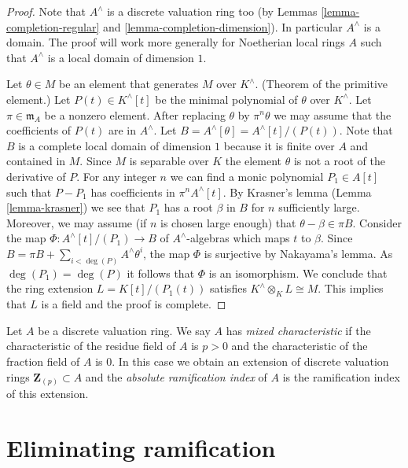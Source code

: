 \begin{proof}
Note that $A^\wedge$ is a discrete valuation ring too (by
Lemmas \ref{lemma-completion-regular} and \ref{lemma-completion-dimension}).
In particular $A^\wedge$ is a domain. The proof will work more generally
for Noetherian local rings $A$ such that $A^\wedge$ is a local domain
of dimension $1$.

\medskip\noindent
Let $\theta \in M$ be an element that generates $M$ over $K^\wedge$.
(Theorem of the primitive element.)
Let $P(t) \in K^\wedge[t]$ be the minimal polynomial of $\theta$ over
$K^\wedge$. Let $\pi \in \mathfrak m_A$ be a nonzero element.
After replacing $\theta$ by $\pi^n\theta$ we may assume that
the coefficients of $P(t)$ are in $A^\wedge$. Let
$B = A^\wedge[\theta] = A^\wedge[t]/(P(t))$. Note that $B$ is
a complete local domain of dimension $1$ because it is finite over $A$ and
contained in $M$. Since $M$ is separable over $K$ the element $\theta$
is not a root of the derivative of $P$. For any integer $n$ we can find
a monic polynomial $P_1 \in A[t]$ such that $P - P_1$ has coefficients in
$\pi^nA^\wedge[t]$. By Krasner's lemma (Lemma \ref{lemma-krasner}) we see that
$P_1$ has a root $\beta$ in $B$ for $n$ sufficiently large.
Moreover, we may assume (if $n$ is chosen large enough)
that $\theta - \beta \in \pi B$. Consider the map
$\Phi : A^\wedge[t]/(P_1) \to B$ of $A^\wedge$-algebras
which maps $t$ to $\beta$. Since
$B = \pi B + \sum_{i < \deg(P)} A^\wedge \theta^i$, the map $\Phi$
is surjective by Nakayama's lemma. As $\deg(P_1) = \deg(P)$ it
follows that $\Phi$ is an isomorphism. We conclude that the ring
extension $L = K[t]/(P_1(t))$ satisfies $K^\wedge \otimes_K L \cong M$.
This implies that $L$ is a field and the proof is complete.
\end{proof}

\begin{definition}
\label{definition-mixed}
Let $A$ be a discrete valuation ring. We say $A$ has {\it mixed characteristic}
if the characteristic of the residue field of $A$ is $p > 0$ and the
characteristic of the fraction field of $A$ is $0$.
In this case we obtain an extension of discrete valuation rings
$\mathbf{Z}_{(p)} \subset A$ and the {\it absolute ramification index}
of $A$ is the ramification index of this extension.
\end{definition}





\section{Eliminating ramification}
\label{section-eliminating-ramification}

